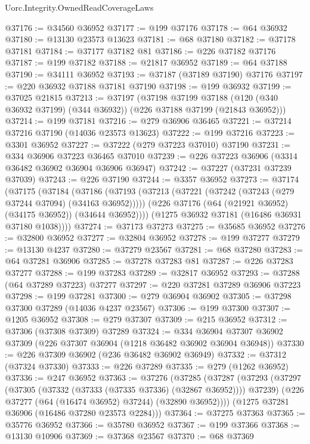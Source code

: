 \begin{lexlean}{Uorc.Integrity.OwnedReadCoverageLaws}
\begin{coremodule}
@37176 := @34560 @36952
@37177 := @199 @37176
@37178 := @64 @36932
@37180 := @13130 @23573 @13623
@37181 := @68 @37180
@37182 := @37178 @37181
@37184 := @37177 @37182 @81
@37186 := @226 @37182 @37176
@37187 := @199 @37182
@37188 := @21817 @36952
@37189 := @64 @37188
@37190 := @34111 @36952
@37193 := @37187 (@37189 @37190) @37176
@37197 := @220 @36932 @37188 @37181 @37190
@37198 := @199 @36932
@37199 := @37025 @21815
@37213 := @37197
    (@37198
      @37199
      @37188
      (@120 (@340 @36932 @37199) (@344 @36932))
      (@226 @37188 @37199 (@21843 @36952)))
@37214 := @199 @37181
@37216 := @279 @36906 @36465
@37221 := @37214 @37216 @37190 (@14036 @23573 @13623)
@37222 := @199 @37216
@37223 := @3301 @36952
@37227 := @37222 (@279 @37223 @37010) @37190
@37231 := @334 @36906 @37223 @36465 @37010
@37239 := @226 @37223 @36906 (@3314 @36482 @36902 @36904 @36906 @36947)
@37242 := @37227 (@37231 @37239 @37039)
@37243 := @226 @37190
@37244 := @3357 @36952
@37273 := @37174
    (@37175
      (@37184
        (@37186
          (@37193
            (@37213 (@37221 (@37242 (@37243 (@279 @37244 @37094) (@34163 @36952)))))
            (@226 @37176 (@64 (@21921 @36952) (@34175 @36952)) (@34644 @36952))))
        (@1275 @36932 @37181 (@16486 @36931 @37180 @1038))))
@37274 := @37173 @37273
@37275 := @35685 @36952
@37276 := @32800 @36952
@37277 := @32804 @36952
@37278 := @199 @37277
@37279 := @13130 @4237
@37280 := @37279 @23567
@37281 := @68 @37280
@37283 := @64 @37281 @36906
@37285 := @37278 @37283 @81
@37287 := @226 @37283 @37277
@37288 := @199 @37283
@37289 := @32817 @36952
@37293 := @37288 (@64 @37289 @37223) @37277
@37297 := @220 @37281 @37289 @36906 @37223
@37298 := @199 @37281
@37300 := @279 @36904 @36902
@37305 := @37298 @37300 @37289 (@14036 @4237 @23567)
@37306 := @199 @37300
@37307 := @1205 @36952
@37308 := @279 @37307
@37309 := @215 @36952
@37312 := @37306 (@37308 @37309) @37289
@37324 := @334 @36904 @37307 @36902 @37309 (@226 @37307 @36904 (@1218 @36482 @36902 @36904 @36948))
@37330 := @226 @37309 @36902 (@236 @36482 @36902 @36949)
@37332 := @37312 (@37324 @37330)
@37333 := @226 @37289
@37335 := @279 (@1262 @36952)
@37336 := @247 @36952
@37363 := @37276
    (@37285
      (@37287
        (@37293
          (@37297 (@37305 (@37332 (@37333 (@37335 @37336) (@32867 @36952)))) @37239)
          (@226 @37277 (@64 (@16474 @36952) @37244) (@32890 @36952))))
      (@1275 @37281 @36906 (@16486 @37280 @23573 @2284)))
@37364 := @37275 @37363
@37365 := @35776 @36952
@37366 := @35780 @36952
@37367 := @199 @37366
@37368 := @13130 @10906
@37369 := @37368 @23567
@37370 := @68 @37369

\end{coremodule}
\end{lexlean}
